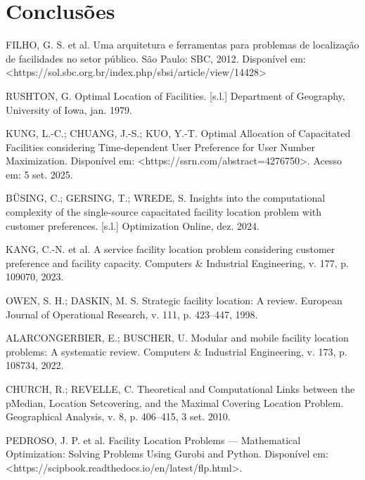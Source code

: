 \documentclass[12pt]{article}
\begin{document}
\section{Conclusões}\label{sec:figs}


\begin{thebibliography}{99}

 FILHO, G. S. et al. Uma arquitetura e ferramentas para problemas de localização de facilidades no setor público. São Paulo: SBC, 2012. Disponível em: <https://sol.sbc.org.br/index.php/sbsi/article/view/14428>

 RUSHTON, G. Optimal Location of Facilities. [s.l.] Department of Geography, University of Iowa, jan. 1979.

 KUNG, L.-C.; CHUANG, J.-S.; KUO, Y.-T. Optimal Allocation of Capacitated Facilities considering Time-dependent User Preference for User Number Maximization. Disponível em: <https://ssrn.com/abstract=4276750>. Acesso em: 5 set. 2025. 

 BÜSING, C.; GERSING, T.; WREDE, S. Insights into the computational complexity of the single-source capacitated facility location problem with customer preferences. [s.l.] Optimization Online, dez. 2024. 

 KANG, C.-N. et al. A service facility location problem considering customer preference and facility capacity. Computers \& Industrial Engineering, v. 177, p. 109070, 2023.

 OWEN, S. H.; DASKIN, M. S. Strategic facility location: A review. European Journal of Operational Research, v. 111, p. 423–447, 1998. 

 ALARCONGERBIER, E.; BUSCHER, U. Modular and mobile facility location problems: A systematic review. Computers \& Industrial Engineering, v. 173, p. 108734, 2022. 

 CHURCH, R.; REVELLE, C. Theoretical and Computational Links between the pMedian, Location Setcovering, and the Maximal Covering Location Problem. Geographical Analysis, v. 8, p. 406–415, 3 set. 2010. 

 PEDROSO, J. P. et al. Facility Location Problems — Mathematical Optimization: Solving Problems Using Gurobi and Python. Disponível em: <https://scipbook.readthedocs.io/en/latest/flp.html>.

\end{thebibliography}
\end{document}
